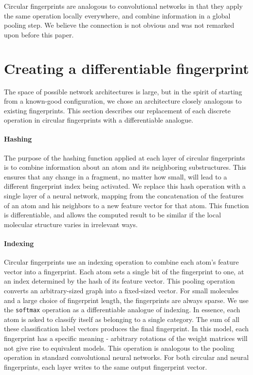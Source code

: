 \documentclass{article}
\begin{document}

Circular fingerprints are analogous to convolutional networks in that they apply the same operation locally everywhere, and combine information in a global pooling step.
We believe the connection is not obvious and was not remarked upon before this paper.

\section{Creating a differentiable fingerprint}
The space of possible network architectures is large, but in the spirit of starting from a known-good configuration, we chose an architecture closely analogous to existing fingerprints.
This section describes our replacement of each discrete operation in circular fingerprints with a differentiable analogue.

\paragraph{Hashing}
The purpose of the hashing function applied at each layer of circular fingerprints is to combine information about an atom and its neighboring substructures.
This ensures that any change in a fragment, no matter how small, will lead to a different fingerprint index being activated.
We replace this hash operation with a single layer of a neural network, mapping from the concatenation of the features of an atom and his neighbors to a new feature vector for that atom.
This function is differentiable, and allows the computed result to be similar if the local molecular structure varies in irrelevant ways.

\paragraph{Indexing}
Circular fingerprints use an indexing operation to combine each atom's feature vector into a fingerprint.
Each atom sets a single bit of the fingerprint to one, at an index determined by the hash of its feature vector.
This pooling operation converts an arbitrary-sized graph into a fixed-sized vector.
For small molecules and a large choice of fingerprint length, the fingerprints are always sparse.
We use the \texttt{softmax} operation as a differentiable analogue of indexing.
In essence, each atom is asked to classify itself as belonging to a single category.
The sum of all these classification label vectors produces the final fingerprint.
In this model, each fingerprint has a specific meaning - arbitrary rotations of the weight matrices will not give rise to equivalent models.
This operation is analogous to the pooling operation in standard convolutional neural networks.
For both circular and neural fingerprints, each layer writes to the same output fingerprint vector.
\end{document}
